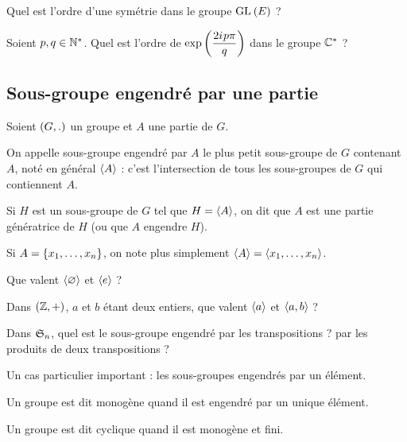 \begin{exo}
Quel est l'ordre d'une symétrie dans le groupe \(\GL{}[E]\) ?
\end{exo}

\begin{exo}
Soient \(p,q\in\Ns\). Quel est l'ordre de \(\exp\paren{\dfrac{2\i p\pi}{q}}\) dans le groupe \(\Cs\) ?
\end{exo}

\subsection{Sous-groupe engendré par une partie}

\begin{defi}
Soient \(\groupe{G}[.]\) un groupe et \(A\) une partie de \(G\).

On appelle sous-groupe engendré par \(A\) le plus petit sous-groupe de \(G\) contenant \(A\), noté en général \(\sgeng{A}\) : c'est l'intersection de tous les sous-groupes de \(G\) qui contiennent \(A\).

Si \(H\) est un sous-groupe de \(G\) tel que \(H=\sgeng{A}\), on dit que \(A\) est une partie génératrice de \(H\) (ou que \(A\) engendre \(H\)).
\end{defi}

Si \(A=\accol{x_1,\dots,x_n}\), on note plus simplement \(\sgeng{A}=\sgeng{x_1,\dots,x_n}\).

\begin{exo}
Que valent \(\sgeng{\ensvide}\) et \(\sgeng{e}\) ?
\end{exo}

\begin{exo}
Dans \(\groupe{\Z}\), \(a\) et \(b\) étant deux entiers, que valent \(\sgeng{a}\) et \(\sgeng{a,b}\) ?
\end{exo}

\begin{exo}
Dans \(\S{n}\), quel est le sous-groupe engendré par les transpositions ? par les produits de deux transpositions ?
\end{exo}

Un cas particulier important : les sous-groupes engendrés par un élément.

\begin{defi}
Un groupe est dit monogène quand il est engendré par un unique élément.

Un groupe est dit cyclique quand il est monogène et fini.
\end{defi}

